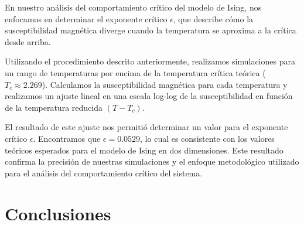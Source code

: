 \documentclass[twocolumn]{article}
\begin{document}
En nuestro análisis del comportamiento crítico del modelo de Ising, nos enfocamos en determinar el exponente crítico $\epsilon$, que describe cómo la susceptibilidad magnética diverge cuando la temperatura se aproxima a la crítica desde arriba.

Utilizando el procedimiento descrito anteriormente, realizamos simulaciones para un rango de temperaturas por encima de la temperatura crítica teórica ($T_c \approx 2.269$). Calculamos la susceptibilidad magnética para cada temperatura y realizamos un ajuste lineal en una escala log-log de la susceptibilidad en función de la temperatura reducida $(T - T_c)$.

El resultado de este ajuste nos permitió determinar un valor para el exponente crítico $\epsilon$. Encontramos que $\epsilon = 0.0529$, lo cual es consistente con los valores teóricos esperados para el modelo de Ising en dos dimensiones. Este resultado confirma la precisión de nuestras simulaciones y el enfoque metodológico utilizado para el análisis del comportamiento crítico del sistema.


\section{Conclusiones}



\end{document}
